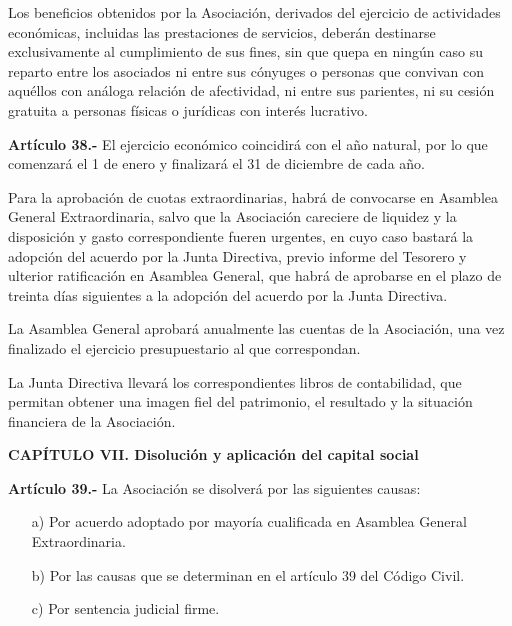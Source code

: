\documentclass[a4paper,12pt]{article}
\begin{document}
\begin{onehalfspace}
Los beneficios obtenidos por la Asociaci\'on, derivados del ejercicio de actividades econ\'omicas, incluidas las prestaciones de servicios, deber\'an destinarse exclusivamente al cumplimiento de sus fines, sin que quepa en ning\'un caso su reparto entre los asociados ni entre sus c\'onyuges o personas que convivan con aqu\'ellos con an\'aloga relaci\'on de afectividad, ni entre sus parientes, ni su cesi\'on gratuita a personas f\'isicas o jur\'idicas con inter\'es lucrativo.

\bigskip\bigskip

\textbf{Art\'iculo 38.-} El ejercicio econ\'omico coincidir\'a con el a\~no natural, por lo que comenzar\'a el 1 de enero y finalizar\'a el 31 de diciembre de cada a\~no.

Para la aprobaci\'on de cuotas extraordinarias, habr\'a de convocarse en Asamblea General Extraordinaria, salvo que la Asociaci\'on careciere de liquidez y la disposici\'on y gasto correspondiente fueren urgentes, en cuyo caso bastar\'a la adopci\'on del acuerdo por la Junta Directiva, previo informe del Tesorero y ulterior ratificaci\'on en Asamblea General, que habr\'a de aprobarse en el plazo de treinta d\'ias siguientes a la adopci\'on del acuerdo por la Junta Directiva.

La Asamblea General aprobar\'a anualmente las cuentas de la Asociaci\'on, una vez finalizado el ejercicio presupuestario al que correspondan.

La Junta Directiva llevar\'a los correspondientes libros de contabilidad, que permitan obtener una imagen fiel del patrimonio, el resultado y la situaci\'on financiera de la Asociaci\'on.

\bigskip\bigskip

\begin{center}
\textbf{CAP\'ITULO VII. Disoluci\'on y aplicaci\'on del capital social}
\end{center}

\bigskip\bigskip

\textbf{Art\'iculo 39.-} La Asociaci\'on se disolver\'a por las siguientes causas:
\begin{itemize}
\item [a)] Por acuerdo adoptado por mayor\'ia cualificada en Asamblea General Extraordinaria.
\item [b)] Por las causas que se determinan en el art\'iculo 39 del C\'odigo Civil.
\item [c)] Por sentencia judicial firme.
\end{itemize}


\end{onehalfspace}
\end{document}
